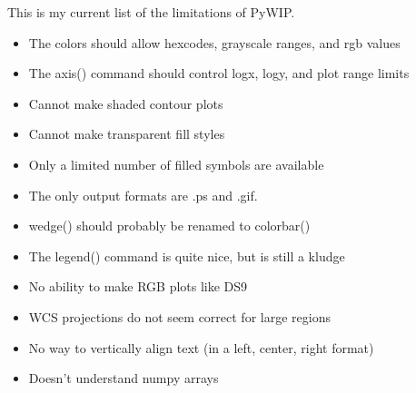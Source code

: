 \documentclass[12pt]{article}
\newcommand{\pywip}{PyWIP}
\begin{document}
This is my current list of the limitations of \pywip.
\begin{itemize}
\item The colors should allow hexcodes, grayscale ranges, and rgb values
\item The axis() command should control logx, logy, and plot range limits
\item Cannot make shaded contour plots
\item Cannot make transparent fill styles
\item Only a limited number of filled symbols are available
\item The only output formats are .ps and .gif.
\item wedge() should probably be renamed to colorbar()
\item The legend() command is quite nice, but is still a kludge
\item No ability to make RGB plots like DS9
\item WCS projections do not seem correct for large regions
\item No way to vertically align text (in a left, center, right format)
\item Doesn't understand numpy arrays
\end{itemize}
\end{document}
